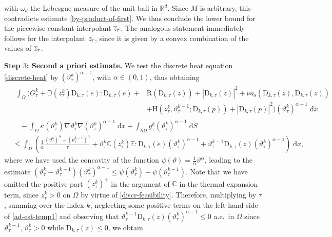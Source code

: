 \documentclass[a4paper,10pt,reqno]{amsart}
\numberwithin{equation}{section}
\newcommand{\R}{\mathbb{R}}
\numberwithin{equation}{section}
\def\dd{\;\!\mathrm{d}} %
\newcommand{\teta}{\vartheta}
\newcommand{\piecewiseConstant}[2]{\overline{#1}_{\kern-1pt#2}}
\newcommand{\pwc}{\piecewiseConstant}
\newcommand{\piecewiseLinear}[2]{{#1}_{\kern-1pt#2}}
\newcommand{\pwl}{\piecewiseLinear}
\newcommand{\bbC}{\mathbb{C}}
\newcommand{\bbD}{\mathbb{D}}
\newcommand{\bbE}{\mathbb{E}}
\newcommand{\condu}{\kappa}
\newcommand{\dip}[3]{\mathrm{H}(#1,#2;#3)}
\newcommand{\did}[1]{\mathrm{R}(#1)}
\newcommand{\ass}{a_{\mathrm{s}}}
\newcommand{\Gtau}[1]{G_\tau^{#1}}
\newcommand{\gtau}[1]{g_\tau^{#1}}
\newcommand{\ztau}[1]{z_\tau^{#1}}
\newcommand{\tetau}[1]{\teta_\tau^{#1}}
\newcommand{\Dtau}[2]{\mathrm{D}_{#1,\tau}(#2)}
\begin{document}
with $\omega_d$ the Lebesgue measure of the unit ball in $\R^d$. Since $M$ is arbitrary, this contradicts estimate \eqref{by-product-of-first}.
We thus conclude 
 the lower bound for  the piecewise constant interpolant $\pwc z\tau$. The analogous statement
immediately  follows 
for the interpolant $\pwl z\tau$, since it is given by a convex combination of the values of $\pwc z\tau$.
\par
\noindent 
\textbf{Step $3$: Second a priori estimate.} We test the discrete heat equation 
\eqref{discrete-heat} by $(\tetau{k})^{\alpha-1}$, with $\alpha \in (0,1)$, thus obtaining   
\begin{equation}
\label{ad-est-temp1}
\begin{aligned}
& 
\begin{aligned}
\int_\Omega \Big(  \Gtau{k} {+} \bbD (\ztau k)  \Dtau{k} e :  \Dtau{k} e    {+}  & \did{\Dtau k z} {+}   \left|  \Dtau{k} z \right|^2 {+} \bar{\nu} \ass   (\Dtau{k} z,\Dtau{k} z) 
\\
&
{+} \dip{\ztau k}{\tetau{k-1}}{\Dtau{k} p}  {+}  \left|  \Dtau{k} p \right|^2\Big)  (\tetau{k})^{\alpha-1} \dd x
\end{aligned}
  \\ & \quad
- \int_\Omega \condu(\tetau k) \nabla \tetau k \nabla  (\tetau{k})^{\alpha-1} \dd  x + 
\int_{\partial\Omega} \gtau k  (\tetau{k})^{\alpha-1} \dd S  
\\
& 
\leq \int_\Omega  \left( \frac1{\alpha}\frac{(\tetau k)^\alpha - (\tetau {k-1})^\alpha}{\tau} {+} 
\tetau{k} \bbC(\ztau k) \bbE : \Dtau k e (\tetau{k})^{\alpha-1} {+} \tetau{k-1} \Dtau{k} z (\tetau{k})^{\alpha-1}  \right)  \dd  x,
\end{aligned}
\end{equation}
where we have used  the concavity of the function
$\psi(\teta)=\tfrac1{\alpha}\teta^\alpha$, leading to the  estimate  $(\tetau{k} {-} \tetau{k-1}) (\tetau k)^{\alpha-1} \leq  \psi(\tetau k)  - \psi (\tetau {k-1})$.  Note that we have omitted the positive part $(\ztau k)^+$ in the argument of $\bbC$ in the thermal expansion term, since $\ztau k >0$ on $\Omega$ by virtue of  \eqref{discr-feasibility}. 
Therefore,  multiplying by $\tau$, summing over the index $k$,   neglecting some  positive terms on the left-hand side of \eqref{ad-est-temp1}
and observing that
$ \tetau{k-1} \Dtau{k} z (\tetau{k})^{\alpha-1}  \leq 0 $ a.e.\ in $\Omega$ since $\tetau{k-1},\, \tetau k>0$ while $\Dtau k z \leq 0$, 
  we obtain
\end{document}
